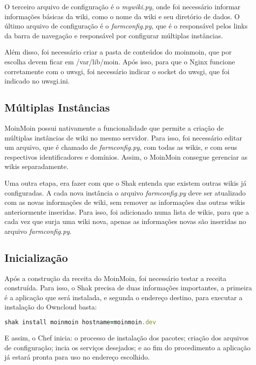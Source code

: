 O terceiro arquivo de configuração é o \textit{mywiki.py}, onde foi necessário
informar informações básicas da wiki, como o nome da wiki e seu diretório de dados. 
O último arquivo de configuração é o \textit{farmconfig.py}, que é o responsável pelos 
links da barra de navegação e responsável por configurar múltiplas instâncias.

Além disso, foi necessário criar a pasta de conteúdos do moinmoin, que por
escolha devem ficar em /var/lib/moin. Após isso, para que o Nginx funcione corretamente
com o uwsgi, foi necessário indicar o socket do uwsgi, que foi indicado no uwsgi.ini.

\subsection{Múltiplas Instâncias}

MoinMoin possui nativamente a funcionalidade que permite a criação de múltiplas 
instâncias de wiki no mesmo servidor. Para isso, foi necessário editar um arquivo,
que é chamado de \textit{farmconfig.py}, com todas as wikis, e com seus 
respectivos identificadores e domínios. Assim, o MoinMoin consegue gerenciar as 
wikis separadamente. 

Uma outra etapa, era fazer com que o Shak entenda que existem outras wikis já 
configuradas. A cada nova instância
o arquivo \textit{farmconfig.py} deve ser atualizado com as novas 
informações de wiki, sem remover as
informações das outras wikis anteriormente inseridas. Para isso, foi adicionado
numa lista de wikis, para que a cada vez que surja uma wiki nova, apenas as
informações novas são inseridas no arquivo \textit{farmconfig.py}.

\subsection{Inicialização}

Após a construção da receita do MoinMoin, foi necessário testar a receita construída. Para 
isso, o Shak precisa de duas informações importantes, a primeira é a aplicação
que será instalada, e segunda o endereço destino, para executar a instalação
do Owncloud basta:

\begin{lstlisting}[language=Ruby,label=dice_index,caption={Exemplo de execução de instalação do owncloud com shak}]
shak install moinmoin hostname=moinmoin.dev
\end{lstlisting}

E assim, o Chef inicia: o processo de instalação dos pacotes; criação dos arquivos
de configuração; incia os serviços desejados; e ao fim do procedimento a aplicação
já estará pronta para uso no endereço escolhido.

